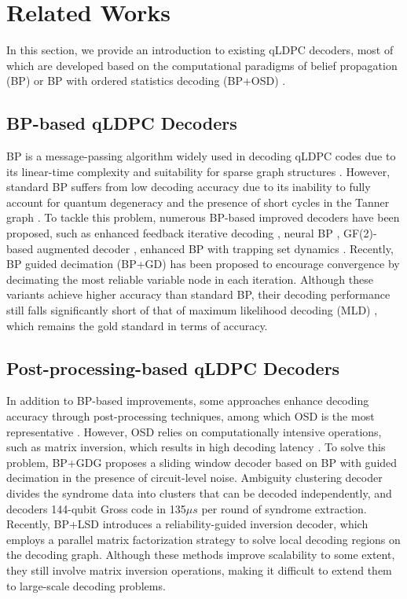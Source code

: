 \section{Related Works}
In this section, we provide an introduction to existing qLDPC decoders, most of which are developed based on the computational paradigms of belief propagation (BP) \cite{bp} or BP with ordered statistics decoding (BP+OSD) \cite{bposd}.

\subsection{BP-based qLDPC Decoders}
BP is a message-passing algorithm widely used in decoding qLDPC codes due to its linear-time complexity and suitability for sparse graph structures \cite{muller2025improved,miao2024joint}. However, standard BP suffers from low decoding accuracy due to its inability to fully account for quantum degeneracy and the presence of short cycles in the Tanner graph \cite{kuo2022exploiting}. To tackle this problem, numerous BP-based improved decoders have been proposed, such as enhanced feedback iterative decoding \cite{wang2012enhanced}, neural BP \cite{liu2019neural}, GF(2)-based augmented decoder \cite{rigby2019modified}, enhanced BP with trapping set dynamics \cite{chytas2024enhanced}. Recently, BP guided decimation (BP+GD) \cite{bpgd} has been proposed to encourage convergence by decimating the most reliable variable node in each iteration. Although these variants achieve higher accuracy than standard BP, their decoding performance still falls significantly short of that of maximum likelihood decoding (MLD) \cite{mld}, which remains the gold standard in terms of accuracy.

\subsection{Post-processing-based qLDPC Decoders}
In addition to BP-based improvements, some approaches enhance decoding accuracy through post-processing techniques, among which OSD is the most representative \cite{ninkovic2024decoding,bhattacharyya2025decoding}. However, OSD relies on computationally intensive operations, such as matrix inversion, which results in high decoding latency \cite{valls2021syndrome}. To solve this problem, BP+GDG \cite{bpgdg} proposes a sliding window decoder based on BP with guided decimation in the presence of circuit-level noise. Ambiguity clustering decoder \cite{wolanski2024ambiguity} divides the syndrome data into clusters that can be decoded independently, and decoders 144-qubit Gross code in 135$\mu s$ per round of syndrome extraction. Recently, BP+LSD \cite{bplsd} introduces a reliability-guided inversion decoder, which employs a parallel matrix factorization strategy to solve local decoding regions on the decoding graph. Although these methods improve scalability to some extent, they still involve matrix inversion operations, making it difficult to extend them to large-scale decoding problems.